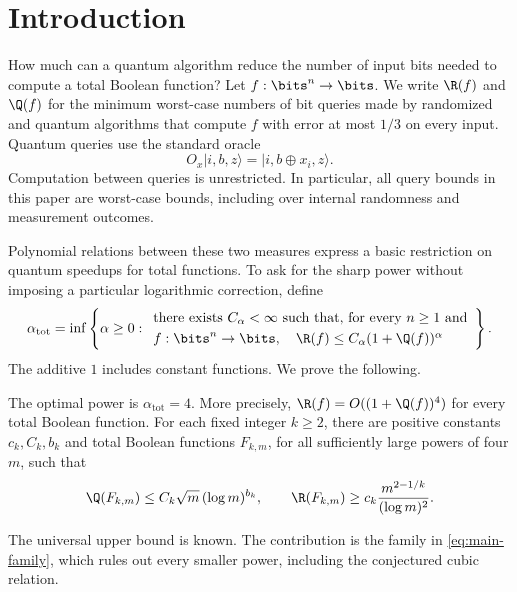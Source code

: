 \section{Introduction}\label{sec:introduction}

How much can a quantum algorithm reduce the number of input bits needed
to compute a total Boolean function? Let $f:\bits^n\to\bits$. We write
$\R(f)$ and $\Q(f)$ for the minimum worst-case numbers of bit queries made
by randomized and quantum algorithms that compute $f$ with error at most
$1/3$ on every input. Quantum queries use the standard oracle
\[
 O_x\lvert i,b,z\rangle=\lvert i,b\oplus x_i,z\rangle.
\]
Computation between queries is unrestricted. In particular, all query
bounds in this paper are worst-case bounds, including over internal
randomness and measurement outcomes.

Polynomial relations between these two measures express a basic
restriction on quantum speedups for total functions. To ask for the sharp
power without imposing a particular logarithmic correction, define
\begin{equation}\label{eq:alpha}
 \alpha_{\mathrm{tot}}=
 \inf\left\{\alpha\ge0:
 \begin{array}{l}
 \text{there exists }C_\alpha<\infty\text{ such that, for every }n\ge1\nobreak\text{ and}\smallskip\\
 f:\bits^n\to\bits,\quad
 \R(f)\le C_\alpha(1+\Q(f))^\alpha
 \end{array}\right\}.
\end{equation}
The additive $1$ includes constant functions. We prove the following.

\begin{theorem}\label{thm:main}
The optimal power is $\alpha_{\mathrm{tot}}=4$.
More precisely, $\R(f)=O((1+\Q(f))^4)$ for every total Boolean function.
For each fixed integer $k\ge2$, there are positive constants $c_k,C_k,b_k$
and total Boolean functions $F_{k,m}$, for all sufficiently large powers
of four $m$, such that
\begin{equation}\label{eq:main-family}
 \Q(F_{k,m})\le C_k\sqrt m\,(\log m)^{b_k},
 \qquad
 \R(F_{k,m})\ge c_k\frac{m^{2-1/k}}{(\log m)^2}.
\end{equation}
\end{theorem}

The universal upper bound is known. The contribution is the family in
\eqref{eq:main-family}, which rules out every smaller power, including
the conjectured cubic relation.

